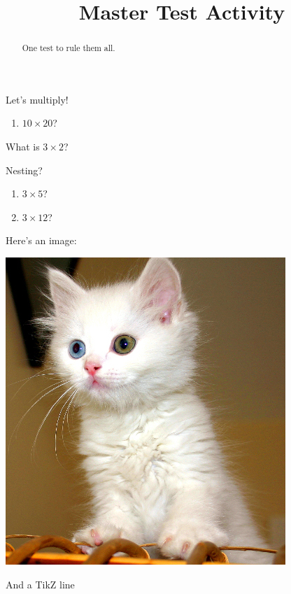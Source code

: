 \documentclass{ximera}
\title{Master Test Activity}
\begin{document}
\begin{abstract}
  One test to rule them all.
\end{abstract}

Let's multiply!

\begin{enumerate}[align=left]
	\item \begin{question} $10 \times 20$?  \end{question}
\end{enumerate}

\begin{question}
	What is $3 \times 2$?  
	\begin{question}
		Nesting? 
	\end{question}
	\begin{enumerate}
		\item \begin{prompt} $3 \times 5$? \end{prompt}  
		\item $3 \times 12$? 
	\end{enumerate}
\end{question}

Here's an image:
\begin{image}
	\includegraphics{testCat.jpg}
\end{image}
And a TikZ line
\begin{image}
\end{image}
\end{document}
